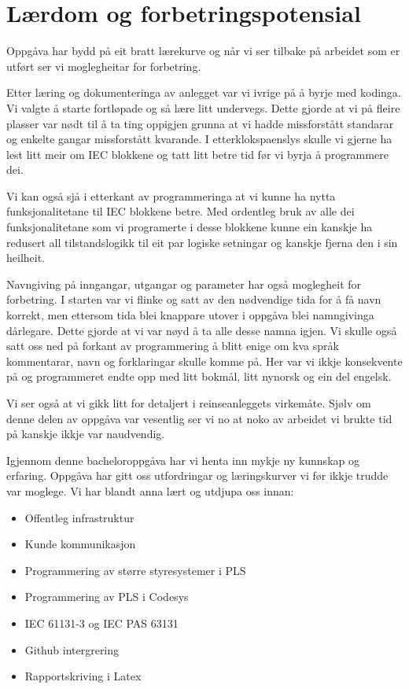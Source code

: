 \section{Lærdom og forbetringspotensial}
\thispagestyle{fancy}

Oppgåva har bydd på eit bratt lærekurve og når vi ser tilbake på arbeidet som er utført
ser vi moglegheitar for forbetring.

Etter læring og dokumenteringa av anlegget var vi ivrige på å byrje med kodinga.
Vi valgte å starte fortløpade og så lære litt undervegs.
Dette gjorde at vi på fleire plasser var nødt til å ta ting oppigjen grunna at vi hadde missforstått standarar og enkelte gangar missforstått kvarande.
I etterklokspaenslys skulle vi gjerne ha lest litt meir om IEC blokkene og tatt litt betre tid før vi byrja å programmere dei.

Vi kan også sjå i etterkant av programmeringa at vi kunne ha nytta funksjonalitetane til IEC blokkene betre.
Med ordentleg bruk av alle dei funksjonalitetane som vi programerte i desse blokkene kunne ein kanskje ha redusert all tilstandslogikk
til eit par logiske setningar og kanskje fjerna den i sin heilheit.

Navngiving på inngangar, utgangar og parameter har også moglegheit for forbetring.
I starten var vi flinke og satt av den nødvendige tida for å få navn korrekt, men ettersom tida blei knappare utover i oppgåva
blei namngivinga dårlegare. Dette gjorde at vi var nøyd å ta alle desse namna igjen. \newline
Vi skulle også satt oss ned på forkant av programmering å blitt enige om kva språk kommentarar, navn og forklaringar skulle komme på.
Her var vi ikkje konsekvente på og programmeret endte opp med litt bokmål, litt nynorsk og ein del engelsk.

Vi ser også at vi gikk litt for detaljert i reinseanleggets virkemåte.
Sjølv om denne delen av oppgåva var vesentlig ser vi no at noko av arbeidet vi brukte tid på kanskje ikkje var naudvendig.


Igjennom denne bacheloroppgåva har vi henta inn mykje ny kunnskap og erfaring.
Oppgåva har gitt oss utfordringar og læringskurver vi før ikkje trudde var moglege.
Vi har blandt anna lært og utdjupa oss innan:

\begin{itemize}
    \item Offentleg infrastruktur
    \item Kunde kommunikasjon
    \item Programmering av større styresystemer i PLS
    \item Programmering av PLS i Codesys
    \item IEC 61131-3 og IEC PAS 63131
    \item Github intergrering
    \item Rapportskriving i Latex
\end{itemize}

